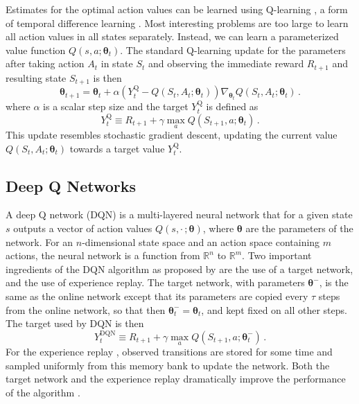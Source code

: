 \documentclass[letterpaper]{article}
\def\reals{\mathbb{R}}
\def\th{\bm\theta}
\begin{document}
Estimates for the optimal action values can be learned using Q-learning \citep{Watkins:1989}, a form of temporal difference learning \citep{Sutton:1988}.
Most interesting problems are too large to learn all action values in all states separately.  Instead, we can learn a parameterized value function $Q(s,a;\th_t)$.
The standard Q-learning update for the parameters after taking action $A_t$ in state $S_t$ and observing the immediate reward $R_{t+1}$ and resulting state $S_{t+1}$ is then
\begin{equation}\label{Q}
\th_{t+1} = \th_t + \alpha (Y^{\text{Q}}_t - Q(S_t,A_t;\th_t)) \nabla_{\th_t} Q(S_t,A_t;\th_t) \,.
\end{equation}
where $\alpha$ is a scalar step size and the target $Y^{\text{Q}}_t$ is defined as
\begin{equation}\label{TDQ}
Y^{\text{Q}}_t \equiv R_{t+1} + \gamma \max_a Q(S_{t+1}, a; \th_t) \,.
\end{equation}
This update resembles stochastic gradient descent, updating the current value $Q(S_t,A_t;\th_t)$ towards a target value $Y^{\text{Q}}_t$.

\subsection{Deep Q Networks} A deep Q network (DQN) is a multi-layered neural network that for a given state $s$ outputs a vector of action values $Q(s,\cdot\,;\th)$, where $\th$ are the parameters of the network.  For an $n$-dimensional state space and an action space containing $m$ actions, the neural network is a function from $\reals^n$ to $\reals^m$.
Two important ingredients of the DQN algorithm as proposed by \citet{Mnih:2015} are the use of a target network, and the use of experience replay.
The target network, with parameters $\th^-$, is the same as the online network except that its parameters are copied every $\tau$ steps from the online network, so that then $\th^-_t = \th_t$, and kept fixed on all other steps.  The target used by DQN is then
\begin{equation}\label{DQN}
Y^{\text{DQN}}_t \equiv R_{t+1} + \gamma \max_a Q(S_{t+1}, a; \th^-_t) \,.
\end{equation}
For the experience replay \citep{Lin:1992}, observed transitions are stored for some time and sampled uniformly from this memory bank to update the network. Both the target network and the experience replay dramatically improve the performance of the algorithm \citep{Mnih:2015}.
\end{document}
